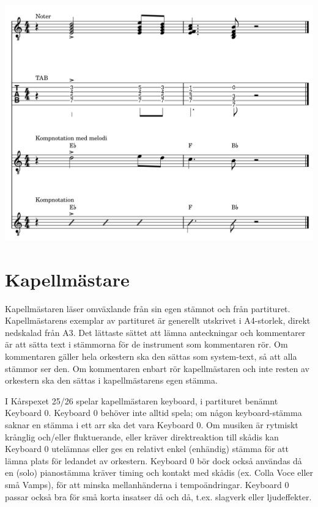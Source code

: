 \begin{center}
    \includegraphics[width=\textwidth]{lilypond/kompnotation.cropped.png}
\end{center}

\section{Kapellmästare}
Kapellmästaren läser omväxlande från sin egen stämnot och från partituret. Kapellmästarens exemplar av partituret är generellt utskrivet i A4-storlek, direkt nedskalad från A3. Det lättaste sättet att lämna anteckningar och kommentarer är att sätta text i stämmorna för de instrument som kommentaren rör. Om kommentaren gäller hela orkestern ska den sättas som system-text, så att alla stämmor ser den. Om kommentaren enbart rör kapellmästaren och inte resten av orkestern ska den sättas i kapellmästarens egen stämma. 

I Kårspexet 25/26 spelar kapellmästaren keyboard, i partituret benämnt Keyboard 0. Keyboard 0 behöver inte alltid spela; om någon keyboard-stämma saknar en stämma i ett arr ska det vara Keyboard 0. Om musiken är rytmiskt krånglig och/eller fluktuerande, eller kräver direktreaktion till skådis kan Keyboard 0 utelämnas eller ges en relativt enkel (enhändig) stämma för att lämna plats för ledandet av orkestern. Keyboard 0 bör dock också användas då en (solo) pianostämma kräver timing och kontakt med skådis (ex. Colla Voce eller små Vamps), för att minska mellanhänderna i tempoändringar. Keyboard 0 passar också bra för små korta insatser då och då, t.ex. slagverk eller ljudeffekter.
